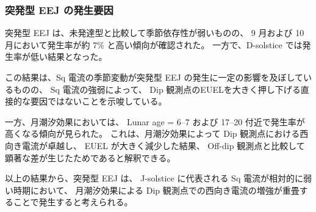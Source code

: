 \subsubsection{突発型 EEJ の発生要因}
\label{sec:discussion_brazil_sudden}

突発型 EEJ は、未発達型と比較して季節依存性が弱いものの、
9 月および 10 月において発生率が約 7\% と高い傾向が確認された。
一方で、D-solstice では発生率が低い結果となった。

この結果は、Sq 電流の季節変動が突発型 EEJ の発生に一定の影響を及ぼしているものの、
Sq 電流の強弱によって、
Dip 観測点のEUELを大きく押し下げる直接的な要因ではないことを示唆している。

一方、月潮汐効果においては、
Lunar age = 6--7 および 17--20 付近で発生率が高くなる傾向が見られた。
これは、月潮汐効果によって Dip 観測点における西向き電流が卓越し、
EUEL が大きく減少した結果、
Off-dip 観測点と比較して顕著な差が生じたためであると解釈できる。

以上の結果から、突発型 EEJ は、
J-solstice に代表される Sq 電流が相対的に弱い時期において、
月潮汐効果による Dip 観測点での西向き電流の増強が重畳することで発生すると考えられる。
